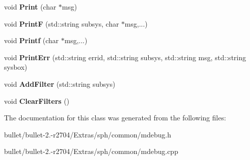 \begin{DoxyCompactItemize}
\item 
\hypertarget{class_c_debug_a5263c8adde4147c56328a9b38fa6d05a}{void {\bfseries Print} (char $\ast$msg)}\label{class_c_debug_a5263c8adde4147c56328a9b38fa6d05a}

\item 
\hypertarget{class_c_debug_a22426590941f5e3b468df0e37344c37c}{void {\bfseries Print\+F} (std\+::string subsys, char $\ast$msg,...)}\label{class_c_debug_a22426590941f5e3b468df0e37344c37c}

\item 
\hypertarget{class_c_debug_a2ebd37a473f5554b0f47327f77197dcc}{void {\bfseries Printf} (char $\ast$msg,...)}\label{class_c_debug_a2ebd37a473f5554b0f47327f77197dcc}

\item 
\hypertarget{class_c_debug_a670dc03391de7140c1c5cbddba44bf35}{void {\bfseries Print\+Err} (std\+::string errid, std\+::string subsys, std\+::string msg, std\+::string sysbox)}\label{class_c_debug_a670dc03391de7140c1c5cbddba44bf35}

\item 
\hypertarget{class_c_debug_a00678788b4ba84a11ddfcd3a9b48f483}{void {\bfseries Add\+Filter} (std\+::string subsys)}\label{class_c_debug_a00678788b4ba84a11ddfcd3a9b48f483}

\item 
\hypertarget{class_c_debug_a3a0212f9ae9c82ac9f619048f935d90d}{void {\bfseries Clear\+Filters} ()}\label{class_c_debug_a3a0212f9ae9c82ac9f619048f935d90d}

\end{DoxyCompactItemize}


The documentation for this class was generated from the following files\+:\begin{DoxyCompactItemize}
\item 
bullet/bullet-\/2.-\/r2704/\+Extras/sph/common/mdebug.\+h\item 
bullet/bullet-\/2.-\/r2704/\+Extras/sph/common/mdebug.\+cpp\end{DoxyCompactItemize}

